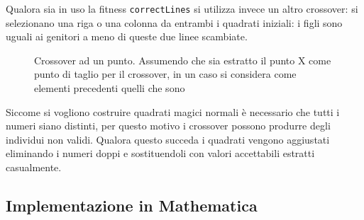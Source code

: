 \documentclass[italian,twoside,twocolumn]{article}
\begin{document}
Qualora sia in uso la fitness \texttt{correctLines} si utilizza invece un altro crossover: si selezionano una riga o una colonna da entrambi i quadrati iniziali: i figli sono uguali ai genitori a meno di queste due linee scambiate. 

\begin{figure}[!htbp]
	\centering
	\caption{Crossover ad un punto. Assumendo che sia estratto il punto X come punto di taglio per il crossover, in un caso si considera come elementi precedenti quelli che sono}
	\label{fig:crosso}
\end{figure}

\noindent
Siccome si vogliono costruire quadrati magici normali è necessario che tutti i numeri siano distinti, per questo motivo i crossover possono produrre degli individui non validi. Qualora questo succeda i quadrati vengono aggiustati eliminando i numeri doppi e sostituendoli con valori accettabili estratti casualmente.


\subsection{Implementazione in Mathematica}
\end{document}
